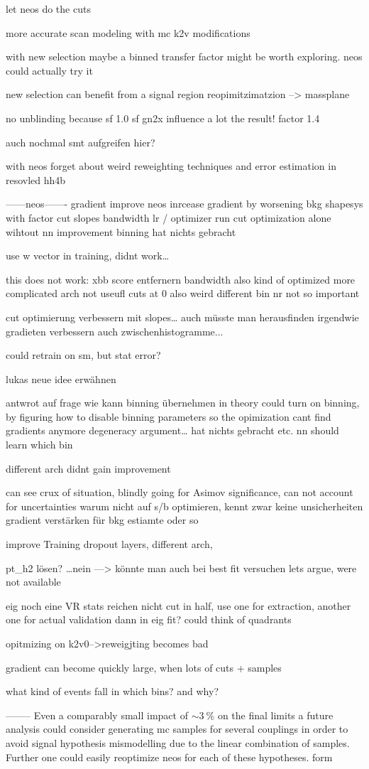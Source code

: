 let neos do the cuts 

more accurate scan modeling with mc k2v modifications 

with new selection maybe a binned transfer factor might be worth exploring.
neos could actually try it

new selection can benefit from a signal region reopimitzimatzion --> massplane


no unblinding because sf
1.0 sf gn2x influence a lot the result! factor 1.4 


auch nochmal smt aufgreifen hier?


with neos forget about weird reweighting techniques and error estimation in resovled hh4b


------neos-------
gradient improve neos
inrcease gradient by worsening bkg shapesys with factor
cut slopes
bandwidth 
lr / optimizer
run cut optimization alone wihtout nn improvement
binning hat nichts gebracht

use w vector in training, didnt work…

this does not work:
xbb score entfernern
bandwidth also kind of optimized
more complicated arch not useufl
cuts at 0 also weird 
different bin nr not so important

cut optimierung verbessern mit slopes… 
auch müsste man herausfinden 
irgendwie gradieten verbessern auch zwischenhistogramme...

could retrain on sm, but stat error?

lukas neue idee erwähnen



antwrot auf frage wie kann binning übernehmen 
in theory could turn on binning, by figuring how to disable binning parameters so the opimization cant find gradients anymore 
degeneracy argument… hat nichts gebracht etc. nn should learn which bin


different arch didnt gain improvement


can see crux of situation, blindly going for Asimov significance, can not account for uncertainties
warum nicht auf s/b optimieren, kennt zwar keine unsicherheiten
gradient verstärken für bkg estiamte oder so


improve Training
dropout layers, different arch, 


pt_h2 lösen? …nein —> könnte man auch bei best fit versuchen
lets argue, were not available

eig noch eine VR
stats reichen nicht 
cut in half, use one for extraction, another one for actual validation dann in eig fit?
could think of quadrants

opitmizing on k2v0-->reweigjting becomes bad

gradient can become quickly large, when lots of cuts + samples

what kind of events fall in which bins? and why?

--------
Even a comparably small impact of $\sim\qty[]{3}{\percent}$ on the final limits a future analysis could consider generating \ac{mc} samples for several \ktwov couplings in order to avoid signal hypothesis mismodelling due to the linear combination of samples. Further one could easily reoptimize neos for each of these hypotheses. form
